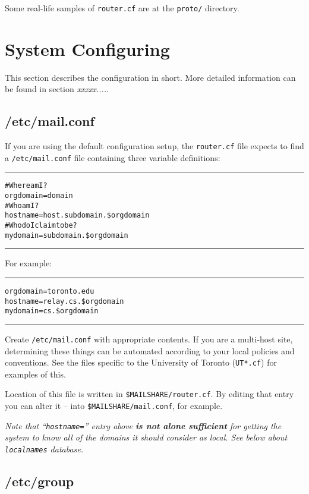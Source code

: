 Some real-life samples of {\tt router.cf} are at the {\tt proto/} directory.

\section{System Configuring}%
%
%

This section describes the configuration in short. More detailed information 
can be found in section {\em xxxxx....\/}.


\subsection{/etc/mail.conf}%
%

If you are using the default configuration setup, the {\tt router.cf} file
expects to find a {\tt /etc/mail.conf} file containing three variable
definitions:
\begin{alltt}\medskip\hrule\medskip
  # Where am I?
  orgdomain=domain
  # Who am I?
  hostname=host.subdomain.\$orgdomain
  # Who do I claim to be?
  mydomain=subdomain.\$orgdomain
\medskip\hrule\medskip
\end{alltt}

For example:
\nopagebreak
\begin{alltt}\medskip\hrule\medskip
  orgdomain=toronto.edu
  hostname=relay.cs.\$orgdomain
  mydomain=cs.\$orgdomain
\medskip\hrule\medskip
\end{alltt}

Create {\tt /etc/mail.conf} with appropriate contents.  If you are a
multi-host site, determining these things can be automated according
to your local policies and conventions.  See the files specific to
the University of Toronto ({\tt UT*.cf}) for examples of this.

Location of this file is written in {\tt \$MAILSHARE/router.cf}.
By editing that entry you can alter it -- into {\tt \$MAILSHARE/mail.conf},
for example.

{\em Note that ``{\tt hostname=}'' entry above {\bf is not alone sufficient}
for getting the system to know all of the domains it should consider
as local.  See below about {\tt localnames} database.}


\subsection{/etc/group}%
%

